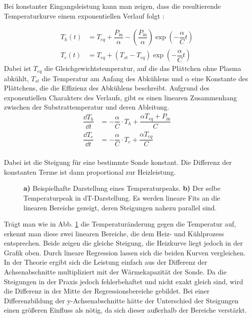 Bei konstanter Eingangsleistung kann man zeigen, dass die resultierende Temperaturkurve einem exponentiellen Verlauf folgt \cite{gauterCalorimetricInvestigationPlasma2018}:

\begin{align*}
	T_h(t) &= T_{eq} + \dfrac{P_\text{in}}{\alpha} - \left( \dfrac{P_\text{in}}{\alpha} \right) \exp\left( - \dfrac{\alpha}{C}t \right)\\
	T_c(t) &= T_{eq} + (T_{st} - T_{eq}) \exp\left( - \dfrac{\alpha}{C}t \right)
\end{align*}
Dabei ist $ T_{eq} $ die Gleichgewichtstemperatur, auf die das Plättchen ohne Plasma abkühlt, $ T_{st} $ die Temperatur am Anfang des Abkühlens und $ \alpha $ eine Konstante des Plättchens, die die Effizienz des Abkühlens beschreibt. Aufgrund des exponentiellen Charakters des Verlaufs, gibt es einen linearen Zusammenhang zwischen der Substrattemperatur und deren Ableitung.
\begin{align*}
 	\dfrac{\dd T_h}{\dd t} &= - \dfrac{\alpha}{C} \cdot T_h  + \dfrac{\alpha T_{eq} + P_\text{in}}{C}\\
 	\dfrac{\dd T_c}{\dd t} &= - \dfrac{\alpha}{C} \cdot T_c  + \dfrac{\alpha T_{eq}}{C}\\
\end{align*}

Dabei ist die Steigung für eine bestimmte Sonde konstant. Die Differenz der konstanten Terme ist dann proportional zur Heizleistung.
\begin{figure}[h]
	\centering
	
	\caption{\textbf{a)} Beispielhafte Darstellung eines Temperaturpeaks. \textbf{b)} Der selbe Temperaturpeak in dT-Darstellung. Es werden lineare Fits an die linearen Bereiche gezeigt, deren Steigungen nahezu parallel sind.}
	\label{fig:peask_bsp}
\end{figure}

Trägt man wie in Abb. \ref{fig:peask_bsp} die Temperaturänderung gegen die Temperatur auf, erkennt man diese zwei linearen Bereiche, die dem Heiz- und Kühlprozess entsprechen. Beide zeigen die gleiche Steigung, die Heizkurve liegt jedoch in der Grafik oben. Durch lineare Regression lassen sich die beiden Kurven vergleichen. In der Theorie ergibt sich die Leistung einfach aus der Differenz der Achsenabschnitte multipliziert mit der Wärmekapazität der Sonde. Da die Steigungen in der Praxis jedoch fehlerbehaftet und nicht exakt gleich sind, wird die Differenz in der Mitte der Regressionsbereiche gebildet. Bei einer Differenzbildung der y-Achsenabschnitte hätte der Unterschied der Steigungen einen größeren Einfluss als nötig, da sich dieser außerhalb der Bereiche verstärkt.


